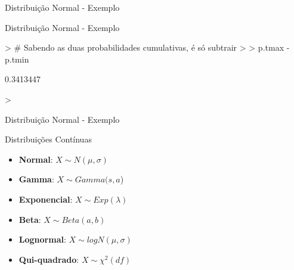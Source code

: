 \documentclass{beamer}
\begin{document}
\begin{frame}[fragile]{Distribuição Normal - Exemplo}


\end{frame} 

\begin{frame}[fragile]{Distribuição Normal - Exemplo}


\begin{Schunk}
\begin{Sinput}
> # Sabendo as duas probabilidades cumulativas, é só subtrair
> 
> p.tmax - p.tmin
\end{Sinput}
\begin{Soutput}
[1] 0.3413447
\end{Soutput}
\begin{Sinput}
> 
\end{Sinput}
\end{Schunk}

\end{frame} 


\begin{frame}[fragile]{Distribuição Normal - Exemplo}


\end{frame} 


\begin{frame}{Distribuições Contínuas}

\begin{small}
\begin{itemize}
  \item \textbf{Normal}: $X \sim N(\mu,\sigma)$
  \vfill
  \item \textbf{Gamma}: $X \sim Gamma(s,a$)
  \vfill
  \item \textbf{Exponencial}: $X \sim Exp(\lambda)$
  \vfill
  \item \textbf{Beta}: $X \sim Beta(a,b)$
  \vfill
  \item \textbf{Lognormal}: $X \sim logN(\mu,\sigma)$
  \vfill
  \item \textbf{Qui-quadrado}: $X \sim \chi^2(df)$
\end{itemize}
\end{small}

\end{frame} 
\end{document}
